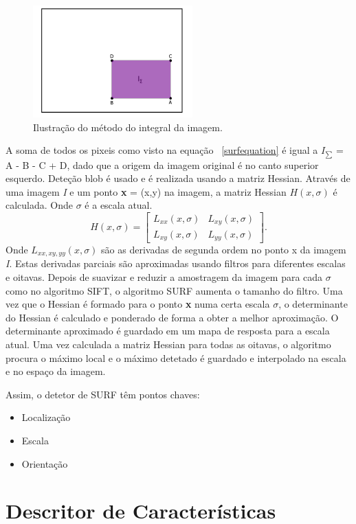 \begin{figure}[h!]
	\centering
	\includegraphics[width=0.4\linewidth]{figures/surfsqware}
	\caption{Ilustração do método do integral da imagem. \cite{VisualOdometryRodasVehicles}}
	\label{fig:surfsqware}
\end{figure}

A soma de todos os pixeis como visto na equação ~\ref{surfequation} é igual a \textit{$I_{\sum}$} = A - B - C + D, dado que a origem da imagem original é no canto superior esquerdo. Deteção blob é usado e é realizada usando a matriz Hessian. Através de uma imagem \textit{I} e um ponto \textbf{x} = (x,y) na imagem, a matriz Hessian $\textit{H}(x,\sigma)$ é calculada. Onde $\sigma$ é a escala atual. \[  \textit{H}(x,\sigma) = \left[ \begin{array}{cc}
L_{xx}(x,\sigma) & L_{xy}(x,\sigma) \\ 
L_{xy}(x,\sigma) & L_{yy}(x,\sigma)
\end{array} \right]. \] 
Onde $\textit{L}_{xx,xy,yy}(x,\sigma)$  são as derivadas de segunda ordem no ponto x da imagem \textit{I}. Estas derivadas parciais são aproximadas usando filtros para diferentes escalas e oitavas. Depois de suavizar e reduzir a amostragem da imagem para cada $\sigma$ como no algoritmo SIFT, o algoritmo SURF aumenta o tamanho do filtro. Uma vez que o Hessian é formado para o ponto \textbf{x} numa certa escala $\sigma$, o determinante do Hessian é calculado e ponderado de forma a obter a melhor aproximação.  O determinante aproximado é guardado em um mapa de resposta para a escala atual.
Uma vez calculada a matriz Hessian para todas as oitavas, o algoritmo procura o máximo local e o máximo detetado é guardado e interpolado na escala e no espaço da imagem. 

Assim, o detetor de SURF têm pontos chaves:
\begin{itemize}
	\item Localização
	\item Escala
	\item Orientação
\end{itemize}


\section{Descritor de Características}

